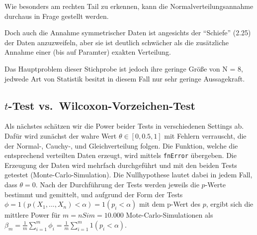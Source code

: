 \documentclass[10pt,]{article}
\begin{document}
Wie besonders am rechten Tail zu erkennen, kann die
Normalverteilungsannahme durchaus in Frage gestellt werden.

Doch auch die Annahme symmetrischer Daten ist angesichts der ``Schiefe''
(2.25) der Daten anzuzweifeln, aber sie ist deutlich schwächer als die
zusätzliche Annahme einer (bis auf Paramter) exakten Verteilung.

Das Hauptproblem dieser Stichprobe ist jedoch ihre geringe Größe von N =
8, jedwede Art von Statistik besitzt in diesem Fall nur sehr geringe
Aussagekraft.

\subsection{\texorpdfstring{\(t\)-Test
vs.~Wilcoxon-Vorzeichen-Test}{t-Test vs.~Wilcoxon-Vorzeichen-Test}}\label{t-test-vs.wilcoxon-vorzeichen-test}

Als nächstes schätzen wir die Power beider Tests in verschiedenen
Settings ab. Dafür wird zunächst der wahre Wert
\(\theta \in [0, 0.5, 1]\) mit Fehlern verrauscht, die der Normal-,
Cauchy-, und Gleichverteilung folgen. Die Funktion, welche die
entsprechend verteilten Daten erzeugt, wird mittels \texttt{fnError}
übergeben. Die Erzeugung der Daten wird mehrfach durchgeführt und mit
den beiden Tests getestet (Monte-Carlo-Simulation). Die Nullhypothese
lautet dabei in jedem Fall, dass \(\theta = 0\). Nach der Durchführung
der Tests werden jeweils die \(p\)-Werte bestimmt und gemittelt, und
aufgrund der Form der Tests
\(\phi =1(p(X_1,...,X_n) < \alpha) = 1(p_i<\alpha)\) mit dem p-Wert des
\(p\), ergibt sich die mittlere Power für \(m= nSim = 10.000\)
Mote-Carlo-Simulationen als
\(\beta_m = \frac{1}{m}\sum_{i=1}^{m}{\phi_i} = \frac{1}{m}\sum_{i=1}^{m}{1(p_i<\alpha)}\).
\end{document}
